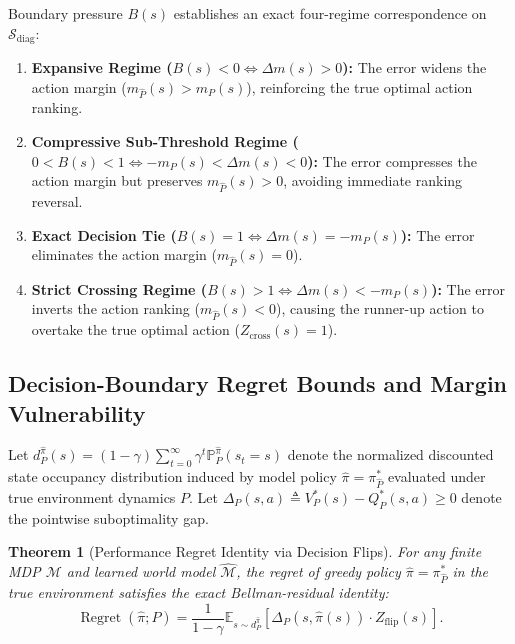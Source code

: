 \documentclass[journal,10pt,twocolumn]{IEEEtran}
\newtheorem{theorem}{Theorem}
\begin{document}
Boundary pressure $B(s)$ establishes an exact four-regime correspondence on $\mathcal{S}_{\mathrm{diag}}$:
\begin{enumerate}
    \item \textbf{Expansive Regime ($B(s) < 0 \iff \Delta m(s) > 0$):} The error widens the action margin ($m_{\hat{P}}(s) > m_P(s)$), reinforcing the true optimal action ranking.
    \item \textbf{Compressive Sub-Threshold Regime ($0 < B(s) < 1 \iff -m_P(s) < \Delta m(s) < 0$):} The error compresses the action margin but preserves $m_{\hat{P}}(s) > 0$, avoiding immediate ranking reversal.
    \item \textbf{Exact Decision Tie ($B(s) = 1 \iff \Delta m(s) = -m_P(s)$):} The error eliminates the action margin ($m_{\hat{P}}(s) = 0$).
    \item \textbf{Strict Crossing Regime ($B(s) > 1 \iff \Delta m(s) < -m_P(s)$):} The error inverts the action ranking ($m_{\hat{P}}(s) < 0$), causing the runner-up action to overtake the true optimal action ($Z_{\mathrm{cross}}(s) = 1$).
\end{enumerate}

\subsection{Decision-Boundary Regret Bounds and Margin Vulnerability}
\label{subsec:regret_bounds_theory}

Let $d_P^{\hat{\pi}}(s) = (1-\gamma)\sum_{t=0}^\infty \gamma^t \mathbb{P}_P^{\hat{\pi}}(s_t = s)$ denote the normalized discounted state occupancy distribution induced by model policy $\hat{\pi} = \pi_{\hat{P}}^*$ evaluated under true environment dynamics $P$. Let $\Delta_P(s, a) \triangleq V_P^*(s) - Q_P^*(s, a) \ge 0$ denote the pointwise suboptimality gap.

\begin{theorem}[Performance Regret Identity via Decision Flips]
\label{thm:regret_identity}
For any finite MDP $\mathcal{M}$ and learned world model $\hat{\mathcal{M}}$, the regret of greedy policy $\hat{\pi} = \pi_{\hat{P}}^*$ in the true environment satisfies the exact Bellman-residual identity:
\begin{equation}
\operatorname{Regret}(\hat{\pi}; P) = \frac{1}{1-\gamma} \mathbb{E}_{s \sim d_P^{\hat{\pi}}} \left[ \Delta_P(s, \hat{\pi}(s)) \cdot Z_{\mathrm{flip}}(s) \right].
\label{eq:regret_exact_flip}
\end{equation}
\end{theorem}
\end{document}
